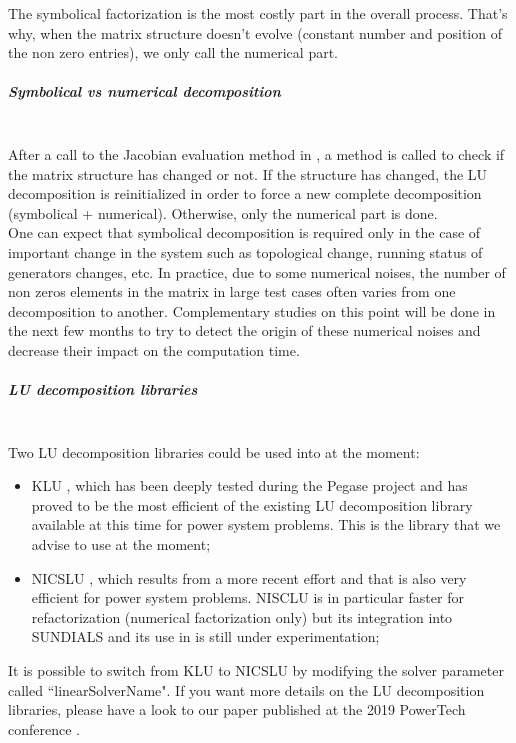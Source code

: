 \documentclass[a4paper, 12pt]{report}
\begin{document}
The symbolical factorization is the most costly part in the overall process. That's why, when the matrix structure doesn't evolve (constant number and position of the non zero entries), we only call the numerical part.

\subparagraph{Symbolical vs numerical decomposition}
~~\\

After a call to the Jacobian evaluation method in \Dynawo, a method is called to check if the matrix structure has changed or not. If the structure has changed, the LU decomposition is reinitialized in order to force a new complete decomposition (symbolical + numerical). Otherwise, only the numerical part is done.  \\

One can expect that symbolical decomposition is required only in the case of important change in the system such as topological change, running status of generators changes, etc. In practice, due to some numerical noises, the number of non zeros elements in the matrix in large test cases often varies from one decomposition to another. Complementary studies on this point will be done in the next few months to try to detect the origin of these numerical noises and decrease their impact on the computation time.

\subparagraph{LU decomposition libraries}
~~\\

Two LU decomposition libraries could be used into \Dynawo   at the moment:
\begin{itemize}
\item KLU \cite{DavisKLU}, which has been deeply tested during the Pegase project and has proved to be the most efficient of the existing LU decomposition library available at this time for power system problems. This is the library that we advise to use at the moment;
\item NICSLU \cite{chenNicsLu}, which results from a more recent effort and that is also very efficient for power system problems. NISCLU is in particular faster for refactorization (numerical factorization only) but its integration into \ac{SUNDIALS} and its use in \Dynawo is still under experimentation;
\end{itemize}

It is possible to switch from KLU to NICSLU by modifying the solver parameter called ``linearSolverName". If you want more details on the LU decomposition libraries, please have a look to our paper published at the 2019 PowerTech conference \cite{LUDecomposition}.
\end{document}
